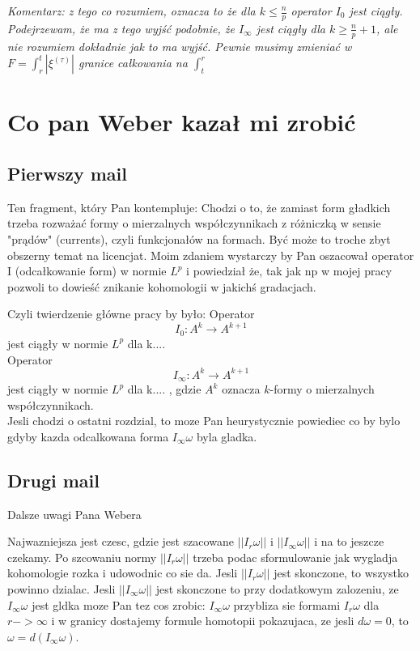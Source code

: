 \documentclass[licencjacka]{pracamgr}
\theoremstyle{definition}
\theoremstyle{definition}
\theoremstyle{plain}
\theoremstyle{plain}
\theoremstyle{plain}
\begin{document}
\emph{Komentarz: z tego co rozumiem, oznacza to że dla $k \leq \frac{n}{p}$
operator $I_0$ jest ciągły. Podejrzewam, że ma z tego wyjść podobnie, że
$I_\infty$ jest ciągły dla $k \geq \frac{n}{p} + 1$, ale nie rozumiem dokładnie
jak to ma wyjść. Pewnie musimy zmieniać w 
$F = \int_r^t |\xi^{(\tau)}| $ granice całkowania na $\int_t^r$}



\section{Co pan Weber kazał mi zrobić}

\subsection{Pierwszy mail}
Ten fragment, który Pan kontempluje: Chodzi o to, że zamiast form gładkich
trzeba rozważać formy o mierzalnych współczynnikach z różniczką w sensie
"prądów" (currents), czyli funkcjonałów na formach. Być może to troche zbyt
obszerny temat na licencjat. Moim zdaniem wystarczy by Pan oszacował operator I
(odcałkowanie form) w normie $L^p$ i powiedział że, tak jak np w mojej pracy
pozwoli to dowieść znikanie kohomologii w jakichś gradacjach.

Czyli twierdzenie główne pracy by było: Operator
\[
 I_0:A^k \to A^{k+1}
\]
jest ciągły w normie $L^p$ dla k.... \\

Operator
\[
I_\infty:A^k \to A^{k+1}
\] jest ciągły w normie $L^p$ dla k.... ,
gdzie $A^k$ oznacza $k$-formy o mierzalnych współczynnikach. \\

 Jesli chodzi o ostatni rozdzial, to moze Pan heurystycznie powiediec co by
bylo gdyby kazda odcalkowana forma $I_\infty \omega$ byla gladka.

\subsection{Drugi mail}

Dalsze uwagi Pana Webera

Najwazniejsza jest czesc, gdzie jest szacowane $||I_r\omega||$ i
$||I_\infty\omega||$ i na to jeszcze czekamy. Po szcowaniu normy $||I_r\omega||$
trzeba podac sformulowanie jak wygladja kohomologie rozka i udowodnic co sie
da. Jesli $||I_r\omega||$ jest skonczone, to wszystko powinno dzialac. Jesli
$||I_\infty\omega||$ jest skonczone to przy dodatkowym zalozeniu, ze
$I_\infty\omega$ jest gldka moze Pan tez cos zrobic: $I_\infty\omega$ przybliza sie
formami $I_r\omega$ dla $r->\infty$ i w granicy dostajemy formule homotopii
pokazujaca, ze jesli $d\omega=0$, to $\omega=d(I_\infty\omega)$.
\end{document}
